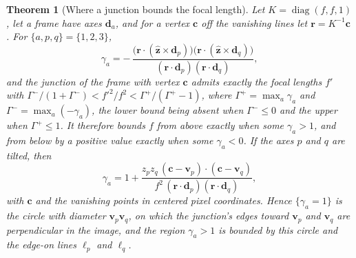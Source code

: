 \documentclass[pdflatex,sn-mathphys-num,iicol]{sn-jnl}
\newcommand{\vd}{\mathbf{d}}
\newcommand{\vr}{\mathbf{r}}
\newcommand{\vc}{\mathbf{c}}
\newcommand{\vv}{\mathbf{v}}
\theoremstyle{thmstyleone}
\newtheorem{theorem}{Theorem}
\theoremstyle{thmstylethree}
\theoremstyle{thmstyletwo}
\begin{document}
\begin{theorem}[Where a junction bounds the focal length]\label{thm:boundmap}
Let $K=\operatorname{diag}(f,f,1)$, let a frame have axes $\vd_a$, and for a vertex $\vc$ off the vanishing lines let $\vr=K^{-1}\vc$. For $\{a,p,q\}=\{1,2,3\}$,
\begin{equation}
\gamma_a=-\,\frac{\bigl(\vr\cdot(\hat{\mathbf z}\times\vd_p)\bigr)\bigl(\vr\cdot(\hat{\mathbf z}\times\vd_q)\bigr)}{(\vr\cdot\vd_p)(\vr\cdot\vd_q)},
\label{eq:boundmap}
\end{equation}
and the junction of the frame with vertex $\vc$ admits exactly the focal lengths $f'$ with $\Gamma^-/(1+\Gamma^-)<f'^2/f^2<\Gamma^+/(\Gamma^+-1)$, where $\Gamma^+=\max_a\gamma_a$ and $\Gamma^-=\max_a(-\gamma_a)$, the lower bound being absent when $\Gamma^-\le0$ and the upper when $\Gamma^+\le1$. It therefore bounds $f$ from above exactly when some $\gamma_a>1$, and from below by a positive value exactly when some $\gamma_a<0$. If the axes $p$ and $q$ are tilted, then
\begin{equation}
\gamma_a=1+\frac{z_pz_q\,(\vc-\vv_p)\cdot(\vc-\vv_q)}{f^2\,(\vr\cdot\vd_p)(\vr\cdot\vd_q)},
\label{eq:thales}
\end{equation}
with $\vc$ and the vanishing points in centered pixel coordinates. Hence $\{\gamma_a=1\}$ is the circle with diameter $\vv_p\vv_q$, on which the junction's edges toward $\vv_p$ and $\vv_q$ are perpendicular in the image, and the region $\gamma_a>1$ is bounded by this circle and the edge-on lines $\ell_p$ and $\ell_q$.
\end{theorem}
\end{document}

